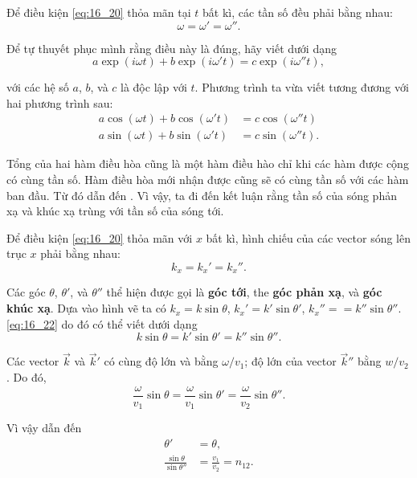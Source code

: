 Để điều kiện \eqref{eq:16_20} thỏa mãn tại $t$ bất kì, các tần số đều phải bằng nhau:
\begin{equation}\label{eq:16_21}
    \omega = \omega' = \omega''.
\end{equation}

\noindent
Để tự thuyết phục mình rằng điều này là đúng, hãy viết  dưới dạng
\begin{equation*}
    a \exp(i\omega t) + b \exp(i\omega' t) = c\exp(i\omega'' t),
\end{equation*}

\noindent
với các hệ số $a$, $b$, và $c$ là độc lập với $t$.
Phương trình ta vừa viết tương đương với hai phương trình sau:
\begin{align*}
    a \cos(\omega t) + b \cos(\omega' t) &= c \cos(\omega'' t)\\
    a \sin(\omega t) + b \sin(\omega' t) &= c \sin(\omega'' t).
\end{align*}

\noindent
Tổng của hai hàm điều hòa cũng là một hàm điều hào chỉ khi các hàm được cộng có cùng tần số.
Hàm điều hòa mới nhận được cũng sẽ có cùng tần số với các hàm ban đầu.
Từ đó dẫn đến .
Vì vậy, ta đi đến kết luận rằng tần số của sóng phản xạ và khúc xạ trùng với tần số của sóng tới.

Để điều kiện \eqref{eq:16_20} thỏa mãn với $x$ bất kì, hình chiếu của các vector sóng lên trục $x$ phải bằng nhau:
\begin{equation}\label{eq:16_22}
    k_x = k_x' = k_x''.
\end{equation}

\noindent
Các góc $\theta$, $\theta'$, và $\theta''$ thể hiện  được gọi là \textbf{góc tới}, the \textbf{góc phản xạ}, và \textbf{góc khúc xạ}.
Dựa vào hình vẽ ta có $k_x = k\sin\theta$, $k_x' = k'\sin\theta'$, $k_x'' =
= k''\sin\theta''$.
\eqref{eq:16_22} do đó có thể viết dưới dạng
\begin{equation*}
    k \sin\theta = k' \sin\theta' = k'' \sin\theta''.
\end{equation*}

\noindent
Các vector $\vec{k}$ và $\vec{k}'$ có cùng độ lớn và bằng $\omega/v_1$; độ lớn của vector $\vec{k}''$ bằng $w/v_2$.
Do đó,
\begin{equation*}
    \frac{\omega}{v_1} \sin\theta = \frac{\omega}{v_1} \sin\theta' = \frac{\omega}{v_2} \sin\theta''.
\end{equation*}

\noindent
Vì vậy dẫn đến
\begin{align}
    \theta' &= \theta, \label{eq:16_23}\\
    \frac{\sin\theta}{\sin\theta''} &= \frac{v_1}{v_2} = n_{12}. \label{eq:16_24}
\end{align}


